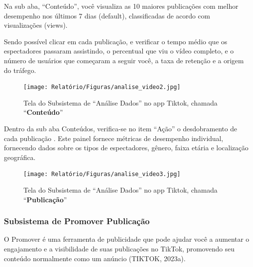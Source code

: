 \newpage
Na sub aba, “Conteúdo”, você visualiza as 10 maiores publicações com melhor desempenho nos últimos 7 dias (default), classificadas de acordo com visualizações (views).\vskip0.3cm

Sendo possível clicar em cada publicação, e verificar o tempo médio que os espectadores passaram assistindo, o percentual que viu o vídeo completo, e o número de usuários que começaram a seguir você, a taxa de retenção e a origem do tráfego.



\begin{figure}[H]
    \centering
    \texttt{[image: Relatório/Figuras/analise\_video2.jpg]}
    \caption{Tela do Subsistema de “Análise Dados” no app Tiktok, chamada “\textbf{Conteúdo}”}
    \label{fig:enter-label} 
\end{figure}

Dentro da sub aba Conteúdos, verifica-se no item “Ação” o desdobramento de cada publicação . Este painel fornece métricas de desempenho individual, fornecendo dados sobre os tipos de espectadores, gênero, faixa etária e localização geográfica.

\begin{figure}[H]
    \centering
    \texttt{[image: Relatório/Figuras/analise\_video3.jpg]}
    \caption{Tela do Subsistema de “Análise Dados” no app Tiktok, chamada “\textbf{Publicação}”}
    \label{fig:enter-label} 
\end{figure}





\newpage
\subsubsection{Subsistema de Promover Publicação}

O Promover é uma ferramenta de publicidade que pode ajudar você a aumentar o engajamento e a visibilidade de suas publicações no TikTok, promovendo seu conteúdo normalmente como um anúncio (TIKTOK, 2023a).



